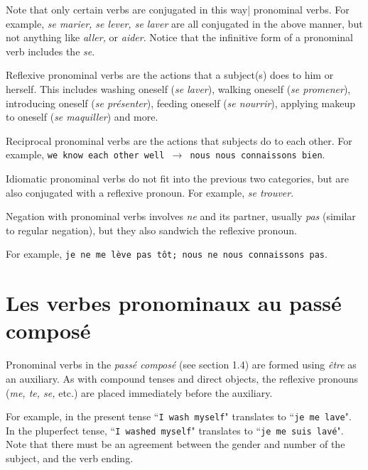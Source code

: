 \documentclass[11pt, oneside]{book}
\begin{document}
{{Note that only certain verbs are conjugated in this way| pronominal verbs. For example, \textit{se marier, se lever, se laver} are all conjugated in the above manner, but not anything like \textit{aller,} or \textit{aider}. Notice that the infinitive form of a pronominal verb includes the \textit{se}. \vspace{0.5\baselineskip}

Reflexive pronominal verbs are the actions that a subject(s) does to him or herself. This includes washing oneself (\textit{se laver}), walking oneself (\textit{se promener}), introducing oneself (\textit{se pr\'esenter}), feeding oneself (\textit{se nourrir}), applying makeup to oneself (\textit{se maquiller}) and more.  \vspace{0.5\baselineskip}

Reciprocal pronominal verbs are the actions that subjects do to each other. For example, \texttt{we know each other well $\rightarrow$ nous nous connaissons bien}. \vspace{0.5\baselineskip}

Idiomatic pronominal verbs do not fit into the previous two categories, but are also conjugated with a reflexive pronoun. For example, \textit{se trouver}.  \vspace{0.5\baselineskip}

Negation with pronominal verbs involves \textit{ne} and its partner, usually \textit{pas} (similar to regular negation), but they also sandwich the reflexive pronoun. \vspace{0.5\baselineskip} 

For example, \texttt{je ne me l\`eve pas t\^ot; nous ne nous connaissons pas}. \vspace{0.5\baselineskip}

\section{Les verbes pronominaux au pass\'e compos\'e}

Pronominal verbs in the \textit{pass\'e compos\'e} (see section 1.4) are formed using \textit{\^etre} as an auxiliary. As with compound tenses and direct objects, the reflexive pronouns (\textit{me, te, se,} etc.) are placed immediately before the auxiliary. \vspace{0.5\baselineskip} 

For example, in the present tense ``\texttt{I wash myself}" translates to ``\texttt{je me lave}". In the pluperfect tense, ``\texttt{I washed myself}" translates to ``\texttt{je me suis lav\'e}".  Note that there must be an agreement between the gender and number of the subject, and the verb ending. \vspace{0.5\baselineskip}

}}
\end{document}
